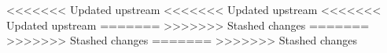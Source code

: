 \def\xxactivite{\ifprof TP -- Corrigé  \else  TP \fi}
\def\xxauteur{\textsl{É. Durif -- X. Pessoles -- J.-P. Berne}}



\def\xxYCartouche{-2.25cm}
\def\xxYongletGarde{.5cm}
\def\xxYOnget{.9cm}





\def\xxfigures{
}%




\setlength{\columnseprule}{.1pt}

\pagestyle{fancy}
\thispagestyle{plain}


<<<<<<< Updated upstream
<<<<<<< Updated upstream
<<<<<<< Updated upstream
\vspace{4.5cm}
\vspace{3.5cm}
\vspace{3.5cm}
=======
\vspace{3.5cm}
>>>>>>> Stashed changes
=======
\vspace{3.5cm}
>>>>>>> Stashed changes
=======
\vspace{3.5cm}
>>>>>>> Stashed changes

\def\columnseprulecolor{\color{ocre}}
\setlength{\columnseprule}{0.4pt} 


\setcounter{exo}{0}
\vspace{3cm}




